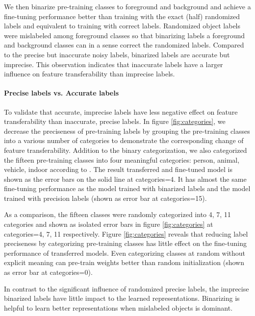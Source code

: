 We then binarize pre-training classes to foreground and background and achieve a fine-tuning performance better than training with the exact (half) randomized labels and equivalent to training with correct labels.
Randomized object labels were mislabeled among foreground classes so that binarizing labels a foreground and background classes can in a sense correct the randomized labels.
Compared to the precise but inaccurate noisy labels, binarized labels are accurate but imprecise.
This observation indicates that inaccurate labels have a larger influence on feature transferability than imprecise labels.

\paragraph{Precise labels vs. Accurate labels}
To validate that accurate, imprecise labels have less negative effect on feature transferability than inaccurate, precise labels.
In figure \ref{fig:categories}, we decrease the preciseness of pre-training labels by grouping the pre-training classes into a various number of categories to demonstrate the corresponding change of feature transferability.
Addition to the binary categorization, we also categorized the fifteen pre-training classes into four meaningful categories: person, animal, vehicle, indoor according to \cite{everingham2015pascal}.
The result transferred and fine-tuned model is shown as the error bars on the solid line at categories=4.
It has almost the same fine-tuning performance as the model trained with binarized labels and the model trained with precision labels (shown as error bar at categories=15).

As a comparison, the fifteen classes were randomly categorized into 4, 7, 11 categories and shown as isolated error bars in figure \ref{fig:categories} at categories=4, 7, 11 respectively.
Figure \ref{fig:categories} reveals that reducing label preciseness by categorizing pre-training classes has little effect on the fine-tuning performance of transferred models.
Even categorizing classes at random without explicit meaning can pre-train weights better than random initialization (shown as error bar at categories=0).

In contrast to the significant influence of randomized precise labels, the imprecise binarized labels have little impact to the learned representations.
Binarizing is helpful to learn better representations when mislabeled objects is dominant.


